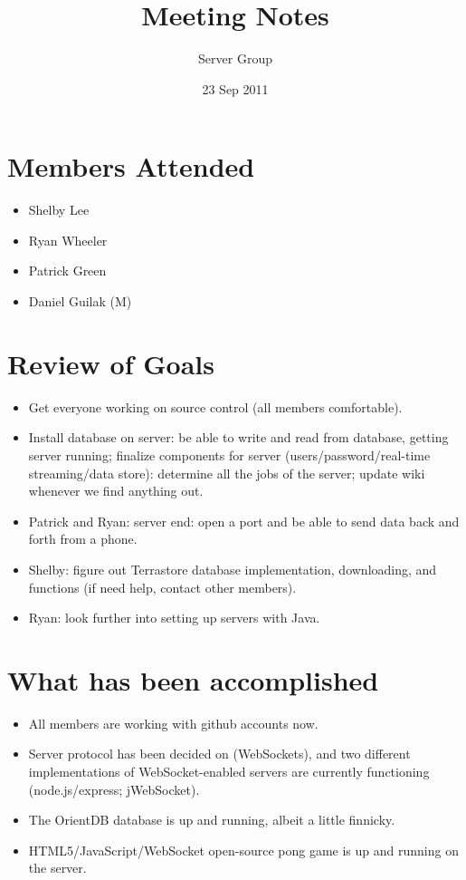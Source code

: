 \documentclass[11pt]{article} %
\title{Meeting Notes}
\author{Server Group}
\date{23 Sep 2011} %
\begin{document}
\maketitle

\section{Members Attended}

\begin{itemize}
	\item Shelby Lee
	\item Ryan Wheeler
	\item Patrick Green
	\item Daniel Guilak (M)
\end{itemize}

\section{Review of Goals}

\begin{itemize}
	\item Get everyone working on source control (all members comfortable).
       \item Install database on server: be able to write and read from database, getting server running; finalize components for server (users/password/real-time streaming/data store): determine all the jobs of the server; update wiki whenever we find anything out.
       \item Patrick and Ryan: server end: open a port and be able to send data back and forth from a phone.
       \item Shelby: figure out Terrastore database implementation, downloading, and functions (if need help, contact other members).
       \item Ryan: look further into setting up servers with Java.
\end{itemize}

\section{What has been accomplished}

\begin{itemize}
	\item All members are working with github accounts now.
       \item Server protocol has been decided on (WebSockets), and two different implementations of WebSocket-enabled servers are currently functioning (node.js/express; jWebSocket).
       \item The OrientDB database is up and running, albeit a little finnicky.
       \item HTML5/JavaScript/WebSocket open-source pong game is up and running on the server.
\end{itemize}
\end{document}
